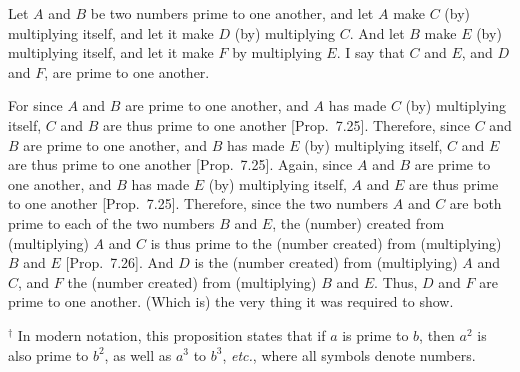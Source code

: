 \begin{Parallel}{}{}
{\epsfysize=2in
\centerline{}

Let $A$ and $B$ be two numbers prime to one another, and let $A$ make
$C$ (by) multiplying itself, and let it make $D$ (by) multiplying $C$. 
And let $B$ make $E$ (by) multiplying itself, and let it make $F$ by multiplying $E$.
I say that $C$ and $E$, and $D$ and $F$, are prime to one another.

For since $A$ and $B$ are prime to one another, and $A$ has made $C$ (by)
multiplying itself, $C$ and $B$ are thus prime to one another [Prop.~7.25]. Therefore, since
$C$ and $B$ are prime to one another, and $B$ has made $E$ (by) multiplying itself,
$C$ and $E$ are thus prime to one another [Prop.~7.25].  Again, since $A$ and $B$ are prime to
one another, and $B$ has made $E$ (by) multiplying itself, $A$ and $E$ are thus
prime to one another [Prop.~7.25]. Therefore,
since the two numbers $A$ and $C$ are both prime to each of the two numbers
$B$ and $E$, the (number) created from (multiplying) $A$ and $C$ is thus
prime to the (number created) from (multiplying) $B$ and $E$ [Prop.~7.26]. And $D$ is the (number created)
from (multiplying) $A$ and $C$, and $F$ the (number created) from (multiplying)
$B$ and $E$. Thus, $D$ and $F$ are prime to one another. (Which is) the 
very thing it
was required to show.}
\end{Parallel}
{\footnotesize\noindent$^\dag$ In modern notation, this proposition
states that if $a$ is prime to $b$, then $a^2$ is also prime to $b^2$,
as well as $a^3$ to $b^3$, {\em etc.}, where all symbols denote numbers.}

